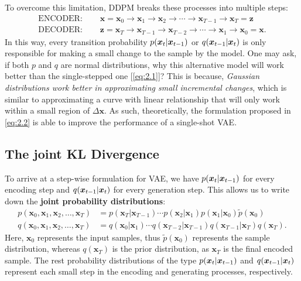 To overcome this limitation, DDPM breaks these processes into multiple steps:
\begin{align}
    \mbox{ENCODER: }\quad&\bm{x}=\bm{x}_0\to\bm{x}_1\to\bm{x}_2\to\cdots\to\bm{x}_{T-1}\to\bm{x}_{T}=\bm{z}\nonumber\\
    \mbox{DECODER: }\quad &\bm{z}=\bm{x}_{T}\to\bm{x}_{T-1}\to\bm{x}_{T-2}\to\cdots\to\bm{x}_1\to\bm{x}_{0}=\bm{x}.\label{eq:2.2}
\end{align}
In this way, every transition probability $p(\bm{x}_{t}|\bm{x}_{t-1})$ or $q(\bm{x}_{t-1}|\bm{x}_{t})$  is only responsible for making a small change to the sample by the model. One may ask, if both $p$ and $q$ are normal distributions, why this alternative model will work better than the single-stepped one [\cref{eq:2.1}]? This is because, \emph{Gaussian distributions work better in approximating small incremental changes}, which is similar to approximating a curve with linear relationship that will only work within a small region of $\Delta\bm{x}$. As such, theoretically, the formulation proposed in \cref{eq:2.2} is able to improve the performance of a single-shot VAE.

\subsection{The joint KL Divergence}
To arrive at a step-wise formulation for VAE, we have \textcolor{red}{$p(\bm{x}_{t}|\bm{x}_{t-1})$} for every encoding step and \textcolor{red}{$q(\bm{x}_{t-1}|\bm{x}_{t})$} for every generation step.
 This allows us to write down the \textbf{joint probability distributions}:
\begin{align}
p(\bm{x}_{0},\bm{x}_1,\bm{x}_2,\ldots,\bm{x}_T)&=p(\bm{x}_T|\bm{x}_{T-1})\cdots p(\bm{x}_2|\bm{x}_1)p(\bm{x}_1|\bm{x}_0)\tilde{p}(\bm{x}_{0})\nonumber\\
q(\bm{x}_{0},\bm{x}_1,\bm{x}_2,\ldots,\bm{x}_T)&=q(\bm{x}_0|\bm{x}_1)\cdots q(\bm{x}_{T-2}|\bm{x}_{T-1})q(\bm{x}_{T-1}|\bm{x}_{T})q(\bm{x}_T). \label{eq:2.3}
\end{align}
Here, $\bm{x}_0$ represents the input samples, thus $\tilde{p}(\bm{x}_0)$ represents the sample distribution, whereas $q(\bm{x}_T)$ is the prior distribution, as $\bm{x}_T$ is the final encoded sample. The rest probability distributions of the type $p(\bm{x}_{t}|\bm{x}_{t-1})$ and $q(\bm{x}_{t-1}|\bm{x}_{t})$ represent each small step in the encoding and generating processes, respectively.

